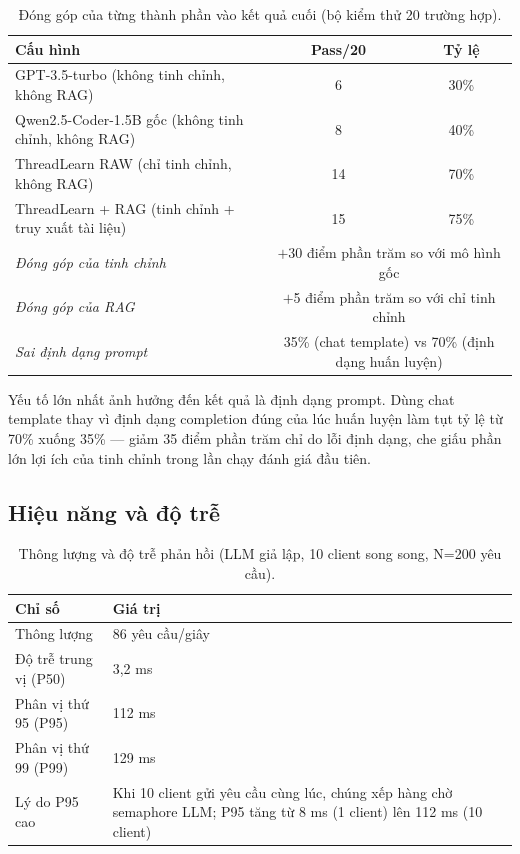 \documentclass[12pt]{article}
\begin{document}
\begin{table}[ht]
  \centering
  \caption{Đóng góp của từng thành phần vào kết quả cuối (bộ kiểm thử 20 trường hợp).}
  \label{tab:dongop}
  \begin{tabular}{@{}lcc@{}}
    \toprule
    \textbf{Cấu hình} & \textbf{Pass/20} & \textbf{Tỷ lệ} \\
    \midrule
    GPT-3.5-turbo (không tinh chỉnh, không RAG)          & 6  & 30\% \\
    Qwen2.5-Coder-1.5B gốc (không tinh chỉnh, không RAG) & 8  & 40\% \\
    ThreadLearn RAW (chỉ tinh chỉnh, không RAG)           & 14 & 70\% \\
    ThreadLearn + RAG (tinh chỉnh + truy xuất tài liệu)   & 15 & 75\% \\
    \midrule
    \textit{Đóng góp của tinh chỉnh}   & \multicolumn{2}{c}{$+$30 điểm phần trăm so với mô hình gốc} \\
    \textit{Đóng góp của RAG}          & \multicolumn{2}{c}{$+$5 điểm phần trăm so với chỉ tinh chỉnh} \\
    \textit{Sai định dạng prompt}      & \multicolumn{2}{c}{35\% (chat template) vs 70\% (định dạng huấn luyện)} \\
    \bottomrule
  \end{tabular}
\end{table}

Yếu tố lớn nhất ảnh hưởng đến kết quả là định dạng prompt.
Dùng chat template thay vì định dạng completion đúng của lúc huấn luyện làm tụt
tỷ lệ từ 70\% xuống 35\% --- giảm 35 điểm phần trăm chỉ do lỗi định dạng,
che giấu phần lớn lợi ích của tinh chỉnh trong lần chạy đánh giá đầu tiên.

\subsection{Hiệu năng và độ trễ}

\begin{table}[ht]
  \centering
  \caption{Thông lượng và độ trễ phản hồi (LLM giả lập, 10 client song song, N=200 yêu cầu).}
  \label{tab:hieunang}
  \begin{tabular}{@{}lp{9cm}@{}}
    \toprule
    \textbf{Chỉ số} & \textbf{Giá trị} \\
    \midrule
    Thông lượng             & 86 yêu cầu/giây \\
    Độ trễ trung vị (P50)   & 3,2 ms \\
    Phân vị thứ 95 (P95)    & 112 ms \\
    Phân vị thứ 99 (P99)    & 129 ms \\
    Lý do P95 cao           & Khi 10 client gửi yêu cầu cùng lúc, chúng xếp hàng
                              chờ semaphore LLM; P95 tăng từ 8 ms (1 client)
                              lên 112 ms (10 client) \\
    \bottomrule
  \end{tabular}
\end{table}
\end{document}
